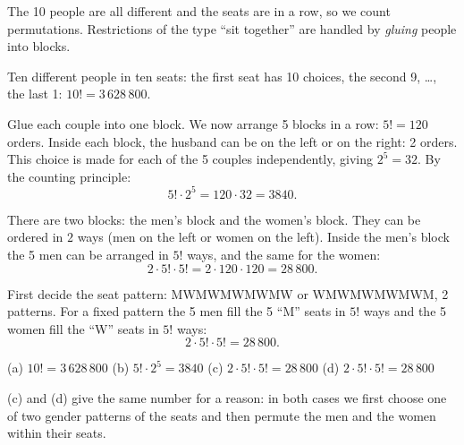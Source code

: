 \begin{solution}
	\idea The 10 people are all different and the seats are in a row, so we count
	permutations. Restrictions of the type ``sit together'' are handled by
	\emph{gluing} people into blocks.

	 Ten different people in ten seats: the first seat has 10 choices,
	the second 9, \ldots, the last 1:
	$10! = 3\,628\,800$.

	 Glue each couple into one block. We now arrange
	5 blocks in a row: $5!=120$ orders. Inside each block, the husband can be on
	the left or on the right: 2 orders. This choice is made for each of the 5
	couples independently, giving $2^5=32$. By the counting principle:
	\[ 5!\cdot2^5 = 120\cdot32 = 3840. \]

	 There are two blocks: the men's
	block and the women's block. They can be ordered in $2$ ways (men on the left
	or women on the left). Inside the men's block the 5 men can be arranged in
	$5!$ ways, and the same for the women:
	\[ 2\cdot5!\cdot5! = 2\cdot120\cdot120 = 28\,800. \]

	 First decide the seat pattern: MWMWMWMWMW or
	WMWMWMWMWM, 2 patterns. For a fixed pattern the 5 men fill the 5 ``M'' seats
	in $5!$ ways and the 5 women fill the ``W'' seats in $5!$ ways:
	\[ 2\cdot5!\cdot5! = 28\,800. \]

	\begin{answer}
		(a) $10!=3\,628\,800$ \quad (b) $5!\cdot2^5=3840$ \quad
		(c) $2\cdot5!\cdot5!=28\,800$ \quad (d) $2\cdot5!\cdot5!=28\,800$
	\end{answer}

	\begin{remark}
		(c) and (d) give the same number for a reason: in both cases we first
		choose one of two gender patterns of the seats and then permute the men and
		the women within their seats.
	\end{remark}
\end{solution}
